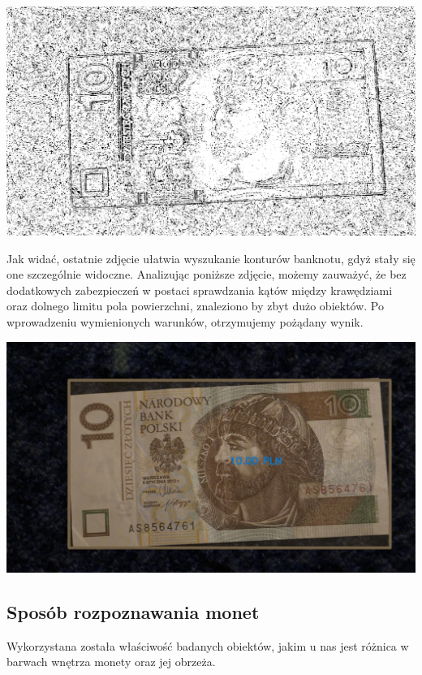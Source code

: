 \documentclass{mwart}
\begin{document}
\begin{center}
    \includegraphics[width=\textwidth]{Gray_10_after.png}
\end{center}

Jak widać, ostatnie zdjęcie ułatwia wyszukanie konturów banknotu, gdyż stały się one szczególnie widoczne. Analizując poniższe zdjęcie, możemy zauważyć, że bez dodatkowych zabezpieczeń w postaci sprawdzania kątów między krawędziami oraz dolnego limitu pola powierzchni, znaleziono by zbyt dużo obiektów. Po wprowadzeniu wymienionych warunków, otrzymujemy pożądany wynik.

\begin{center}
    \includegraphics[width=\textwidth]{Single_10_PLN.png}
\end{center}

\subsection{Sposób rozpoznawania monet}

Wykorzystana została właściwość badanych obiektów, jakim u nas jest różnica w barwach wnętrza monety oraz jej obrzeża.
\end{document}
